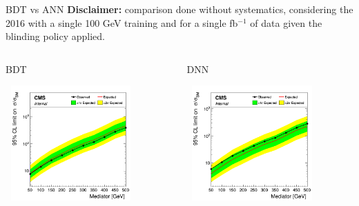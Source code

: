 \documentclass[8pt]{beamer}
\begin{document}
\begin{frame}{BDT vs ANN}
\textbf{Disclaimer:} comparison done without systematics, considering the 2016 with a single 100 GeV training and for a single fb$^{-1}$ of data given the blinding policy applied. \vfill

\begin{columns}
	\begin{column}{0.48 \textwidth}
\begin{center}
\begin{block}{\centering BDT}\end{block}
\includegraphics[width=5cm, height=4.4cm]{figs/limit_ttDM_scalar__set3_BDT.png}
\end{center}
\end{column}
	\begin{column}{0.51 \textwidth}
\begin{figure}[htbp]
\begin{center}
\begin{block}{\centering DNN}\end{block}
\includegraphics[width=5cm, height=4.4cm]{figs/limit_ttDM_scalar__set3_DNN.png}
\end{center}
\end{figure}
	\end{column}
	\end{columns} \vfill
\end{frame}
\end{document}
